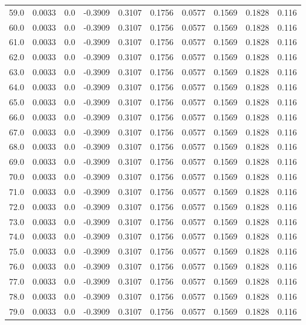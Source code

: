 \begin{longtable}{lrrrrrrrrr}
59.0 & 0.0033 & 0.0 & -0.3909 & 0.3107 & 0.1756 & 0.0577 & 0.1569 & 0.1828 & 0.116 \\
60.0 & 0.0033 & 0.0 & -0.3909 & 0.3107 & 0.1756 & 0.0577 & 0.1569 & 0.1828 & 0.116 \\
61.0 & 0.0033 & 0.0 & -0.3909 & 0.3107 & 0.1756 & 0.0577 & 0.1569 & 0.1828 & 0.116 \\
62.0 & 0.0033 & 0.0 & -0.3909 & 0.3107 & 0.1756 & 0.0577 & 0.1569 & 0.1828 & 0.116 \\
63.0 & 0.0033 & 0.0 & -0.3909 & 0.3107 & 0.1756 & 0.0577 & 0.1569 & 0.1828 & 0.116 \\
64.0 & 0.0033 & 0.0 & -0.3909 & 0.3107 & 0.1756 & 0.0577 & 0.1569 & 0.1828 & 0.116 \\
65.0 & 0.0033 & 0.0 & -0.3909 & 0.3107 & 0.1756 & 0.0577 & 0.1569 & 0.1828 & 0.116 \\
66.0 & 0.0033 & 0.0 & -0.3909 & 0.3107 & 0.1756 & 0.0577 & 0.1569 & 0.1828 & 0.116 \\
67.0 & 0.0033 & 0.0 & -0.3909 & 0.3107 & 0.1756 & 0.0577 & 0.1569 & 0.1828 & 0.116 \\
68.0 & 0.0033 & 0.0 & -0.3909 & 0.3107 & 0.1756 & 0.0577 & 0.1569 & 0.1828 & 0.116 \\
69.0 & 0.0033 & 0.0 & -0.3909 & 0.3107 & 0.1756 & 0.0577 & 0.1569 & 0.1828 & 0.116 \\
70.0 & 0.0033 & 0.0 & -0.3909 & 0.3107 & 0.1756 & 0.0577 & 0.1569 & 0.1828 & 0.116 \\
71.0 & 0.0033 & 0.0 & -0.3909 & 0.3107 & 0.1756 & 0.0577 & 0.1569 & 0.1828 & 0.116 \\
72.0 & 0.0033 & 0.0 & -0.3909 & 0.3107 & 0.1756 & 0.0577 & 0.1569 & 0.1828 & 0.116 \\
73.0 & 0.0033 & 0.0 & -0.3909 & 0.3107 & 0.1756 & 0.0577 & 0.1569 & 0.1828 & 0.116 \\
74.0 & 0.0033 & 0.0 & -0.3909 & 0.3107 & 0.1756 & 0.0577 & 0.1569 & 0.1828 & 0.116 \\
75.0 & 0.0033 & 0.0 & -0.3909 & 0.3107 & 0.1756 & 0.0577 & 0.1569 & 0.1828 & 0.116 \\
76.0 & 0.0033 & 0.0 & -0.3909 & 0.3107 & 0.1756 & 0.0577 & 0.1569 & 0.1828 & 0.116 \\
77.0 & 0.0033 & 0.0 & -0.3909 & 0.3107 & 0.1756 & 0.0577 & 0.1569 & 0.1828 & 0.116 \\
78.0 & 0.0033 & 0.0 & -0.3909 & 0.3107 & 0.1756 & 0.0577 & 0.1569 & 0.1828 & 0.116 \\
79.0 & 0.0033 & 0.0 & -0.3909 & 0.3107 & 0.1756 & 0.0577 & 0.1569 & 0.1828 & 0.116 \\

\end{longtable}
